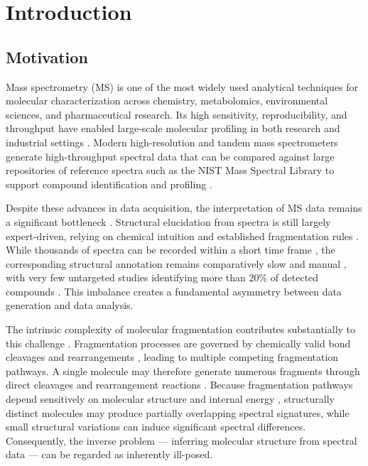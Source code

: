 \chapter{Introduction}
\label{ch:1}
\noindent
\section{Motivation}
Mass spectrometry (MS) is one of the most widely used analytical techniques for molecular characterization across chemistry, metabolomics, environmental sciences, and pharmaceutical research. \cite[p. 1]{Gross2006}
Its high sensitivity, reproducibility, and throughput have enabled large-scale molecular profiling in both research and industrial settings \cite[p.~1764]{Cramer2020}.
Modern high-resolution and tandem mass spectrometers generate high-throughput spectral data that can be compared against large repositories of reference spectra such as the NIST Mass Spectral Library to support compound identification and profiling \cite[pp.~7274-7275]{Stein2012}.

Despite these advances in data acquisition, the interpretation of MS data remains a significant bottleneck \cite[p.~1]{Blazenovic2018}.
Structural elucidation from spectra is still largely expert-driven, relying on chemical intuition and established fragmentation rules \cite[p.~11]{Blazenovic2018}.
While thousands of spectra can be recorded within a short time frame \cite[p.~1]{Blazenovic2018}, the corresponding structural annotation remains comparatively slow and manual \cite[p.~11]{Blazenovic2018}, with very few untargeted studies identifying more than 20\% of detected compounds \cite[p.~3]{Blazenovic2018}.
This imbalance creates a fundamental asymmetry between data generation and data analysis.

The intrinsic complexity of molecular fragmentation contributes substantially to this challenge \cite[pp.~30-31]{Gross2006}.
Fragmentation processes are governed by chemically valid bond cleavages and rearrangements \cite[pp.~30-31]{Gross2006}, leading to multiple competing fragmentation pathways.
A single molecule may therefore generate numerous fragments through direct cleavages and rearrangement reactions \cite[pp.~30-31]{Gross2006}.
Because fragmentation pathways depend sensitively on molecular structure and internal energy \cite[p.~26,pp.~30-31]{Gross2006}, structurally distinct molecules may produce partially overlapping spectral signatures, while small structural variations can induce significant spectral differences. \cite[p.~240]{Gross2006}
Consequently, the inverse problem --- inferring molecular structure from spectral data --- can be regarded as inherently ill-posed.

